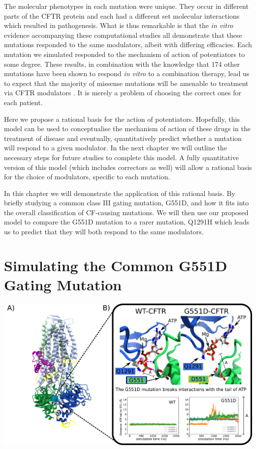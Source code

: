 The molecular phenotypes in each mutation were unique. They occur in different parts of the CFTR protein and each had a different set molecular interactions which resulted in pathogenesis. What is thus remarkable is that the \textit{in vitro} evidence accompanying these computational studies all demonstrate that these mutations responded to the same modulators, albeit with differing efficacies. Each mutation we simulated responded to the mechanism of action of potentiators to some degree. These results, in combination with the knowledge that 174 other mutations have been shown to respond \textit{in vitro} to a combination therapy, lead us to expect that the majority of missense mutations will be amenable to treatment via CFTR modulators \cite{trikafta_FDA_info}. It is merely a problem of choosing the correct ones for each patient.

Here we propose a rational basis for the action of potentiators. Hopefully, this model can be used to conceptualise the mechanism of action of these drugs in the treatment of disease and eventually, quantitatively predict whether a mutation will respond to a given modulator. In the next chapter we will outline the necessary steps for future studies to complete this model. A fully quantitative version of this model (which includes correctors as well) will allow a rational basis for the choice of modulators, specific to each mutation. 

In this chapter we will demonstrate the application of this rational basis. By briefly studying a common class III gating mutation, G551D, and how it fits into the overall classification of CF-causing mutations. We will then use our proposed model to compare the G551D mutation to a rarer mutation, Q1291H which leads us to predict that they will both respond to the same modulators. 

\section{Simulating the Common G551D Gating Mutation}

	\begin{center}
		\includegraphics[width=\textwidth]{figures/perspective/G551D.pdf}
	\end{center}

